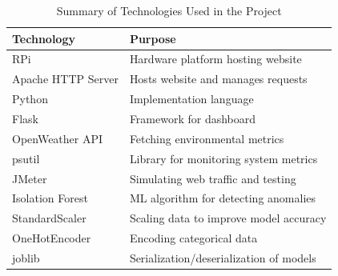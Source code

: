 \documentclass[conference]{IEEEtran}
\begin{document}
\begin{table}[ht]
    \centering
    \caption{Summary of Technologies Used in the Project}
    \label{tab:technologies}
    \small
    \begin{tabular}{ll}
    \toprule
    \textbf{Technology} & \textbf{Purpose} \\
    \midrule
    RPi                    & Hardware platform hosting website \\
    Apache HTTP Server     & Hosts website and manages requests \\
    Python                 & Implementation language \\
    Flask                  & Framework for dashboard \\
    OpenWeather API        & Fetching environmental metrics \\
    psutil                 & Library for monitoring system metrics \\
    JMeter                 & Simulating web traffic and testing \\
    Isolation Forest       & ML algorithm for detecting anomalies \\
    StandardScaler         & Scaling data to improve model accuracy \\
    OneHotEncoder          & Encoding categorical data \\
    joblib                 & Serialization/deserialization of models \\
    \bottomrule
    \end{tabular}
    \end{table}
    
\end{document}
